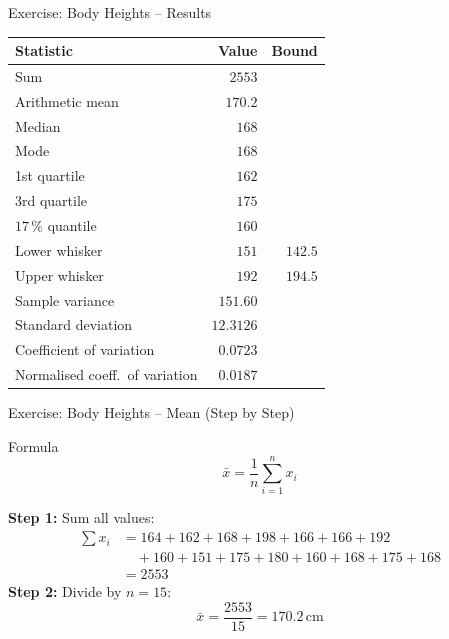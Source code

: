 \documentclass[aspectratio=169,11pt]{beamer}
\begin{document}
\begin{frame}{Exercise: Body Heights -- Results}
  \begin{center}
    \small
    \renewcommand{\arraystretch}{1.0}
    \begin{tabular}{lrr}
      \toprule
      \textbf{Statistic} & \textbf{Value} & \textbf{Bound} \\
      \midrule
      Sum                            & $2553$    & \\
      Arithmetic mean                & $170.2$ & \\
      Median                         & $168$     & \\
      Mode                           & $168$     & \\
      1st quartile                   & $162$     & \\
      3rd quartile                   & $175$     & \\
      $17\,\%$ quantile              & $160$     & \\
      Lower whisker                  & $151$     & $142.5$ \\
      Upper whisker                  & $192$     & $194.5$ \\
      \midrule
      Sample variance                & $151.60$ & \\
      Standard deviation             & $12.3126$  & \\
      Coefficient of variation       & $0.0723$   & \\
      Normalised coeff.\ of variation & $0.0187$   & \\
      \bottomrule
    \end{tabular}
  \end{center}
\end{frame}

\begin{frame}{Exercise: Body Heights -- Mean (Step by Step)}
  \begin{block}{Formula}
    \[ \bar{x} = \frac{1}{n}\sum_{i=1}^{n} x_i \]
  \end{block}
  \vspace{0.2cm}
  \textbf{Step 1:} Sum all values:
  \begin{align*}
    \sum x_i &= 164 + 162 + 168 + 198 + 166 + 166 + 192 \\
             &\quad + 160 + 151 + 175 + 180 + 160 + 168 + 175 + 168 \\
             &= 2553
  \end{align*}
  \textbf{Step 2:} Divide by $n = 15$:
  \[
    \bar{x} = \frac{2553}{15} = 170.2\,\text{cm}
  \]
\end{frame}
\end{document}
